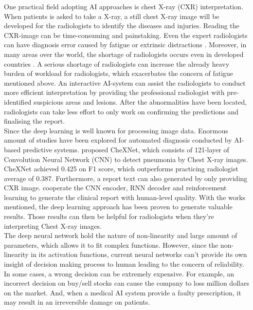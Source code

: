 One practical field adopting AI approaches is chest X-ray (CXR) interpretation. When patients is asked to take a X-ray, a still chest X-ray image will be developed for the radiologists to identify the diseases and injuries. Reading the CXR-image can be time-consuming and painstaking. Even the expert radiologists can have diagnosis error caused by fatigue or extrinsic distractions \citep{Waite2017RadiologistError}. Moreover, in many areas over the world, the shortage of radiologists occurs even in developed countries \citep{Sunshine2004RadiologyShortageUS} \citep{Rimmer2017RadiologistShortageUk}. A serious shortage of radiologists can increase the already heavy burden of workload for radiologists, which exacerbates the concern of fatigue mentioned above. An interactive AI-system can assist the radiologists to conduct more efficient interpretation by providing the professional radiologist with pre-identified suspicious areas and lesions. After the abnormalities have been located, radiologists can take less effort to only work on confirming the predictions and finalising the report. \\

Since the deep learning is well known for processing image data. Enormous amount of studies have been explored for automated diagnosis conducted by AI-based predictive systems. \citet{Rajpurkar2017CheXNet} proposed CheXNet, which consists of 121-layer of Convolution Neural Network (CNN) to detect pneumonia by Chest X-ray images. CheXNet achieved 0.425 on F1 score, which outperforms practicing radiologist average of 0.387. Furthermore, a report text can also generated by only providing CXR image. \citet{Liu2019ReportGeneration} cooperate the CNN encoder, RNN decoder and reinforcement learning to generate the clinical report with human-level quality. With the works mentioned, the deep learning approach has been proven to generate valuable results. Those results can then be helpful for radiologists when they're interpreting Chest X-ray images. \\

The deep neural network hold the nature of non-linearity and large amount of parameters, which allows it to fit complex functions. However, since the non-linearity in its activation functions, current neural networks can't provide its own insight of decision making process to human leading to the concern of reliability. In some cases, a wrong decision can be extremely expensive. For example, an incorrect decision on buy/sell stocks can cause the company to loss million dollars on the market. And, when a medical AI system provide a faulty prescription, it may result in an irreversible damage on patients. \\

